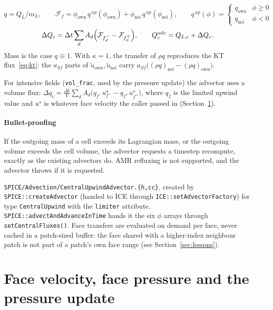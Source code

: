 \documentclass[11pt]{article}
\newcommand{\code}[1]{\texttt{\small #1}}
\newcommand{\file}[1]{\texttt{\small\color{Moss}#1}}
\newcommand{\own}{\mathrm{own}}
\newcommand{\nei}{\mathrm{nei}}
\newcommand{\dt}{\Delta t}
\begin{document}
\begin{equation}
  q = Q_L/m_L,\qquad
  \mathcal F_f = \phi_\own\, q^{\,up}(\phi_\own) + \phi_\nei\, q^{\,up}(\phi_\nei),\qquad
  q^{\,up}(\phi) = \begin{cases} q_\own & \phi\ge 0\\ q_\nei & \phi<0\end{cases}
\end{equation}
\begin{equation}
  \Delta Q_c = \dt\sum_{d} A_d\Bigl(\mathcal F_{f^-_d} - \mathcal F_{f^+_d}\Bigr),
  \qquad Q^{adv}_c = Q_{L,c} + \Delta Q_c .
\end{equation}
Mass is the case $q\equiv 1$. With $\kappa=1$, the transfer of $\rho q$ reproduces the
KT flux~\eqref{eq:kt}: the $a_{Sf}$ parts of $\tilde u_\own,\tilde u_\nei$ carry
$a_{Sf}\bigl((\rho q)_\nei-(\rho q)_\own\bigr)$.

For intensive fields (\code{vol\_frac}, used by the pressure update) the advector uses a
volume flux: $\Delta q_c = \frac{\dt}{V}\sum_d A_d\bigl(q_{f^-}u^\star_{f^-}-q_{f^+}u^\star_{f^+}\bigr)$,
where $q_f$ is the limited upwind value and $u^\star$ is whatever face velocity the caller
passed in (Section~\ref{sec:press}).

\paragraph{Bullet-proofing}
If the outgoing mass of a cell exceeds its Lagrangian mass, or the outgoing volume exceeds
the cell volume, the advector requests a timestep recompute, exactly as the existing
advectors do. AMR refluxing is not supported, and the advector throws if it is requested.

\begin{incode}
\file{SPICE/Advection/CentralUpwindAdvector.\{h,cc\}}, created by \code{SPICE::createAdvector}
(handed to ICE through \code{ICE::setAdvectorFactory}) for type \code{CentralUpwind} with the
\code{limiter} attribute. \code{SPICE::advectAndAdvanceInTime} hands it the six $\phi$ arrays
through \code{setCentralFluxes()}. Face transfers are evaluated on demand per face, never cached in a
patch-sized buffer: the face shared with a higher-index neighbour patch is not part of a
patch's own face range (see Section~\ref{sec:lessons}).
\end{incode}

\section{Face velocity, face pressure and the pressure update}\label{sec:press}
\end{document}
